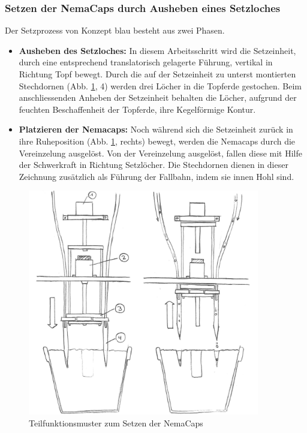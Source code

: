 \subsubsection{Setzen der NemaCaps durch Ausheben eines Setzloches}
Der Setzprozess von Konzept blau besteht aus zwei Phasen.

\begin{itemize}
	\item \textbf{Ausheben des Setzloches:} In diesem Arbeitsschritt wird die Setzeinheit, durch eine entsprechend translatorisch gelagerte Führung, vertikal in Richtung Topf bewegt. Durch die auf der Setzeinheit zu unterst montierten Stechdornen (Abb. \ref{fig:blau_setzeinheit}, 4) werden drei Löcher in die Topferde gestochen. Beim anschliessenden Anheben der Setzeinheit behalten die Löcher, aufgrund der feuchten Beschaffenheit der Topferde, ihre Kegelförmige Kontur.
\newpage	
	\item \textbf{Platzieren der Nemacaps:} Noch während sich die Setzeinheit zurück in ihre Ruheposition (Abb. \ref{fig:blau_setzeinheit}, rechts) bewegt, werden die Nemacaps durch die Vereinzelung ausgelöst. Von der Vereinzelung ausgelöst, fallen diese mit Hilfe der Schwerkraft in Richtung Setzlöcher. Die Stechdornen dienen in dieser Zeichnung zusätzlich als Führung der Fallbahn, indem sie innen Hohl sind.
\end{itemize}

\begin{figure}[H]
	\includegraphics[width=0.9\textwidth]{Illustrationen/5-Konzept/blau_Setzeinheit_ohneLegende.jpg}
	\caption{Teilfunktionsmuster zum Setzen der NemaCaps}
	\label{fig:blau_setzeinheit}
\end{figure}

